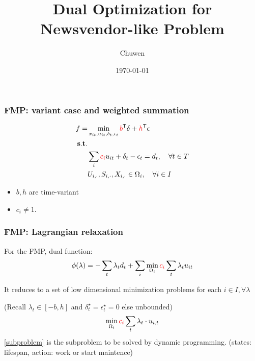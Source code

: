 
\title{Dual Optimization for Newsvendor-like Problem}
\author{Chuwen}
\date{\today}


\frame{\titlepage}



\begin{frame}
  \frametitle{FMP: variant case and weighted summation}
  \begin{align}
    \label{eq:fmp.obj}  f = & \min_{x_{it}, u_{it}, \delta_t, \epsilon_t}
    \textcolor{red}{b}^\mathsf{T}  \delta + \textcolor{red}{h}^\mathsf{T}\epsilon                                   \\
    \nonumber \mathbf{s.t.} &                                                                                       \\
    \label{eq:fmp.demand}   & \sum_i \textcolor{red}{c_i} u_{it} + \delta_t - \epsilon_t = d_t,\quad\forall t \in T \\
                            & U_{i, \cdot}, S_{i, \cdot}, X_{i, \cdot} \in \Omega_i,\quad \forall i\in I
  \end{align}
  \begin{itemize}
    \item \(b, h\) are time-variant
    \item \(c_i \neq 1\).
  \end{itemize}
\end{frame}


\begin{frame}
  \frametitle{FMP: Lagrangian relaxation}
  For the FMP, dual function:
  \[\begin{aligned}
      \phi(\lambda) & = - \sum_t \lambda_t d_t + \sum_i  \min_{\Omega_i} \textcolor{red}{c_i} \sum_t \lambda_t u_{it} \\
    \end{aligned}\]

  It reduces to a set of low dimensional minimization problems for each \(i \in I, \forall \lambda\)

  (Recall \(\lambda_t \in [-b, h] \) and \(\delta_t^\star = \epsilon_t^\star = 0\) else unbounded)
  \begin{equation}\label{subproblem}\begin{aligned}
      \min_{\Omega_i} \textcolor{red}{c_i} \sum_t \lambda_t \cdot u_{i,t}
    \end{aligned}\end{equation}
  \eqref{subproblem} is the subproblem to be solved by dynamic programming. (states: lifespan, action: work or start maintence)
\end{frame}

